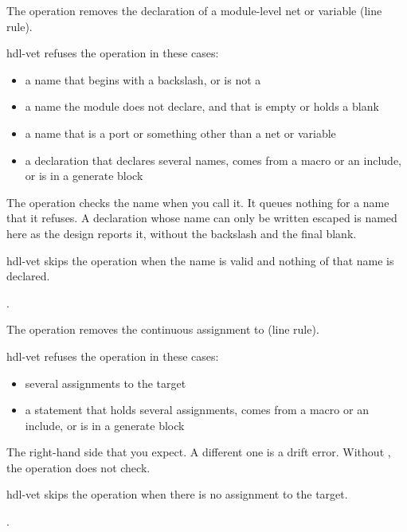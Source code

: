 \begin{entry}{}
\item[Writes] The operation removes the declaration of a module-level net or variable
  (line rule).
\item[Refused] hdl-vet refuses the operation in these cases:
  \begin{itemize}
  \item a name that begins with a backslash, or is not a 
  \item a name the module does not declare, and that is empty or holds a blank
  \item a name that is a port or something other than a net or variable
  \item a declaration that declares several names, comes from a macro or an include, or
    is in a generate block
  \end{itemize}
  The operation checks the name when you call it. It queues nothing for a name that it
  refuses. A declaration whose name can only be written escaped is named here as the
  design reports it, without the backslash and the final blank.
\item[Again] hdl-vet skips the operation when the name is valid and nothing of that name
  is declared.
\item[Example] .
\end{entry}

\begin{entry}{}
\item[Writes] The operation removes the continuous assignment to  (line
  rule).
\item[Refused] hdl-vet refuses the operation in these cases:
  \begin{itemize}
  \item several assignments to the target
  \item a statement that holds several assignments, comes from a macro or an include, or
    is in a generate block
  \end{itemize}
\item[was] The right-hand side that you expect. A different one is a drift error.
  Without , the operation does not check.
\item[Again] hdl-vet skips the operation when there is no assignment to the target.
\item[Example] .
\end{entry}

